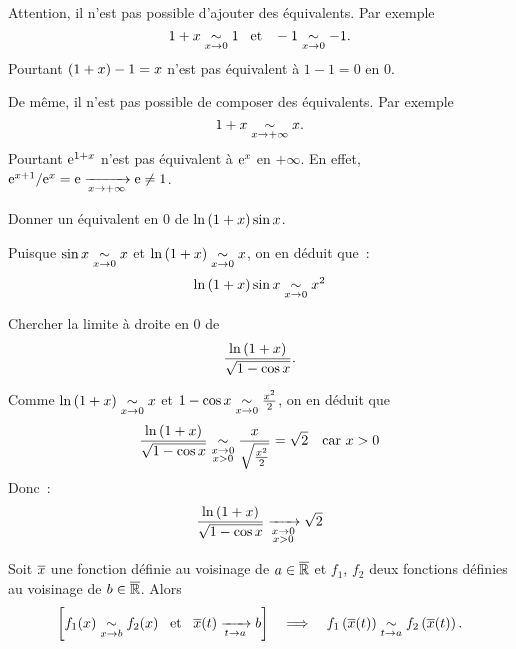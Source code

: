 \documentclass{magnolia}
\begin{document}
\begin{remarques}
\item Attention, il n'est pas possible d'ajouter des équivalents. Par exemple
  \[1+x\underset{x\rightarrow 0}{\sim}1 \quad\!\text{et}\quad\! -1\underset{x\rightarrow 0}{\sim}-1.\]
  Pourtant $\left(1+x\right)-1=x$ n'est pas équivalent à $1-1=0$ en 0.
\item De même, il n'est pas possible de composer des équivalents. Par exemple
  \[1+x\underset{x\rightarrow +\infty}{\sim}x.\]
  Pourtant ${\rm e}^{1+x}$ n'est pas équivalent à ${\rm e}^x$ en $+\infty$. En effet,
  ${\rm e}^{x+1}/{\rm e}^x={\rm e}\xrightarrow[x\rightarrow +\infty]{} {\rm e}\neq 1$.
\end{remarques}

\begin{exos}
\item Donner un équivalent en 0 de $\ln\left(1+x\right)\sin x$.
\begin{sol} Puisque $\sin x\underset{x\rightarrow 0}{\sim}x$ et $\ln\left(1+x\right)\underset{x\rightarrow 0}{\sim}x$, on en déduit
   que~:
   \[\ln\left(1+x\right)\sin x\underset{x\rightarrow 0}{\sim}x^2\]
   \end{sol}
\item Chercher la limite à droite en 0 de
  \[\frac{\ln\left(1+x\right)}{\sqrt{1-\cos x}}.\]
  \begin{sol}
   Comme $\ln\left(1+x\right)\underset{x\rightarrow 0}{\sim}x$ et $1-\cos x\underset{x\rightarrow 0}{\sim}
     \frac{x^2}{2}$, on en déduit que
   \[\frac{\ln\left(1+x\right)}{\sqrt{1-\cos x}}\underset{\substack{x\rightarrow 0\\x>0}}{\sim}\frac{x}{\sqrt{\frac{x^2}{2}}}=
     \sqrt{2} \quad \text{car $x>0$}\]
   Donc~:
   \[\frac{\ln\left(1+x\right)}{\sqrt{1-\cos x}}\xrightarrow[ \substack{x\rightarrow 0 \\ x>0}]{} \sqrt{2}\]
   \end{sol}
\end{exos}

\begin{proposition}[utile=-3]
Soit $\overline{x}$ une fonction définie au voisinage de $a\in\overline{\mathbb{R}}$ et $f_1$, $f_2$
deux fonctions définies au voisinage de $b\in\overline{\mathbb{R}}$. Alors
\[\left[f_1(x)\underset{x\rightarrow b}{\sim}f_2(x) \quad\!\text{et}\quad\! \overline{x}(t)\xrightarrow[t\rightarrow a]{}b\right] \quad\Longrightarrow\quad
  f_1\left(\overline{x}(t)\right)\underset{t\rightarrow a}{\sim}f_2\left(\overline{x}(t)\right).\]
\end{proposition}
\end{document}
